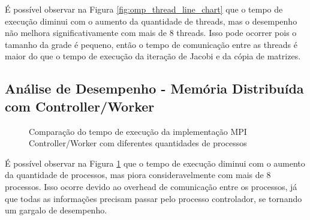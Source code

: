 \documentclass[conference]{IEEEtran}
\begin{document}
É possível observar na Figura \ref{fig:omp_thread_line_chart} que o tempo de execução diminui com o aumento da quantidade de threads, mas o desempenho não melhora significativamente com mais de 8 threads. Isso pode ocorrer pois o tamanho da grade é pequeno, então o tempo de comunicação entre as threads é maior do que o tempo de execução da iteração de Jacobi e da cópia de matrizes.

\subsection{Análise de Desempenho - Memória Distribuída com Controller/Worker}

\begin{figure}[H]
    \centering
    \caption{Comparação do tempo de execução da implementação MPI Controller/Worker com diferentes quantidades de processos}
    \label{fig:mpi_cw_thread_line_chart}
\end{figure}

É possível observar na Figura \ref{fig:mpi_cw_thread_line_chart} que o tempo de execução diminui com o aumento da quantidade de processos, mas piora consideravelmente com mais de 8 processos. Isso ocorre devido ao overhead de comunicação entre os processos, já que todas as informações precisam passar pelo processo controlador, se tornando um gargalo de desempenho.
\end{document}

